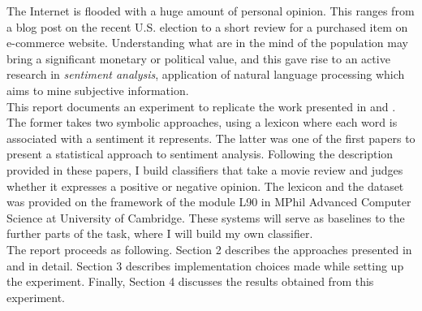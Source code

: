 The Internet is flooded with a huge amount of personal opinion. This ranges from a blog post on the recent U.S. election to a short review for a purchased item on e-commerce website. Understanding what are in the mind of the population may bring a significant monetary or political value, and this gave rise to an active research in {\em sentiment analysis}, application of natural language processing which aims to mine subjective information. \\
This report documents an experiment to replicate the work presented in \cite{wilson2005recognizing} and \cite{pang2002thumbs}. The former takes two symbolic approaches, using a lexicon where each word is associated with a sentiment it represents. The latter was one of the first papers to present a statistical approach to sentiment analysis. Following the description provided in these papers, I build classifiers that take a movie review and judges whether it expresses a positive or negative opinion. The lexicon and the dataset was provided on the framework of the module L90 in MPhil Advanced Computer Science at University of Cambridge. These systems will serve as baselines to the further parts of the task, where I will build my own classifier.\\
The report proceeds as following. Section 2 describes the approaches presented in \cite{wilson2005recognizing} and \cite{pang2002thumbs} in detail. Section 3 describes implementation choices made while setting up the experiment. Finally, Section 4 discusses the results obtained from this experiment.